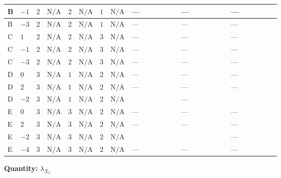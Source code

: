 \documentclass[8pt]{article}
\begin{document}
\begin{landscape}
\begin{longtable}{@{}llcccccc >{\raggedright\arraybackslash}p{0.21\linewidth} >{\raggedright\arraybackslash}p{0.21\linewidth} >{\raggedright\arraybackslash}p{0.21\linewidth}@{}}
\midrule
B & $-1$ & $2$ & $\text{N/A}$ & $2$ & $\text{N/A}$ & $1$ & $\text{N/A}$ & --- & --- & --- \\
\midrule
B & $-3$ & $2$ & $\text{N/A}$ & $2$ & $\text{N/A}$ & $1$ & $\text{N/A}$ & --- & --- & --- \\
\midrule
C & $1$ & $2$ & $\text{N/A}$ & $2$ & $\text{N/A}$ & $3$ & $\text{N/A}$ & --- & --- & --- \\
\midrule
C & $-1$ & $2$ & $\text{N/A}$ & $2$ & $\text{N/A}$ & $3$ & $\text{N/A}$ & --- & --- & --- \\
\midrule
C & $-3$ & $2$ & $\text{N/A}$ & $2$ & $\text{N/A}$ & $3$ & $\text{N/A}$ & --- & --- & --- \\
\midrule
D & $0$ & $3$ & $\text{N/A}$ & $1$ & $\text{N/A}$ & $2$ & $\text{N/A}$ & --- & --- & --- \\
\midrule
D & $2$ & $3$ & $\text{N/A}$ & $1$ & $\text{N/A}$ & $2$ & $\text{N/A}$ & --- & --- & --- \\
\midrule
D & $-2$ & $3$ & $\text{N/A}$ & $1$ & $\text{N/A}$ & $2$ & $\text{N/A}$ & \scriptsize\adjustbox{max width=\linewidth}{$\begin{gathered} 72 {\lambda_{X_{1}}} \left({\lambda_{X_{2}}}\right)^{*}\end{gathered}$} & --- & \scriptsize\adjustbox{max width=\linewidth}{$\begin{gathered} +6 {\lambda_{12}^{(1)}} {\lambda_{X_{7}}^{(1)}}\end{gathered}$} \\
\midrule
E & $0$ & $3$ & $\text{N/A}$ & $3$ & $\text{N/A}$ & $2$ & $\text{N/A}$ & --- & --- & --- \\
\midrule
E & $2$ & $3$ & $\text{N/A}$ & $3$ & $\text{N/A}$ & $2$ & $\text{N/A}$ & --- & --- & --- \\
\midrule
E & $-2$ & $3$ & $\text{N/A}$ & $3$ & $\text{N/A}$ & $2$ & $\text{N/A}$ & \scriptsize\adjustbox{max width=\linewidth}{$\begin{gathered} 88 {\lambda_{X_{1}}} \left({\lambda_{X_{2}}}\right)^{*}\end{gathered}$} & \scriptsize\adjustbox{max width=\linewidth}{$\begin{gathered} -24 {g_2}^2 {\lambda_{X_{2}}}\end{gathered}$} & --- \\
\midrule
E & $-4$ & $3$ & $\text{N/A}$ & $3$ & $\text{N/A}$ & $2$ & $\text{N/A}$ & --- & --- & --- \\
\midrule
\bottomrule
\end{longtable}
\clearpage
\noindent\textbf{Quantity: }${\lambda_{X_{2}}}$\par\smallskip

\end{landscape}
\end{document}
